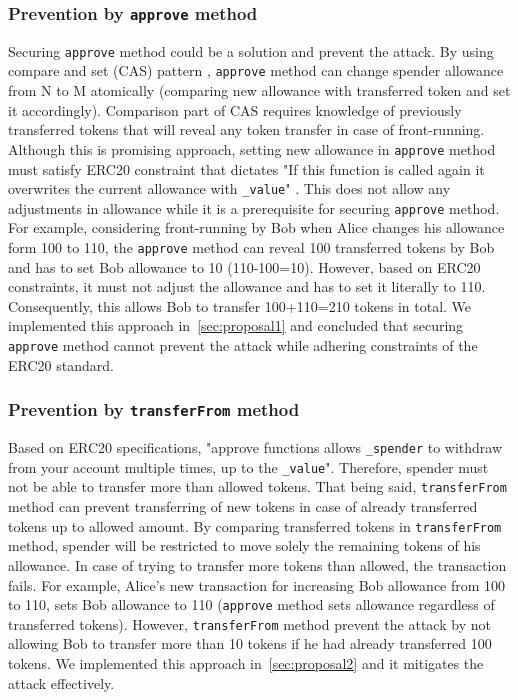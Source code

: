 \subsubsection*{Prevention by \texttt{approve} method} Securing \texttt{approve} method could be a solution and prevent the attack. By using compare and set (CAS) pattern \cite{Ref06}, \texttt{approve} method can change spender allowance from N to M atomically (\ie comparing new allowance with transferred token and set it accordingly). Comparison part of CAS requires knowledge of previously transferred tokens that will reveal any token transfer in case of front-running. Although this is promising approach,  setting new allowance in \texttt{approve} method must satisfy ERC20 constraint that dictates "If this function is called again it overwrites the current allowance with \texttt{\_value}" \cite{Ref08}. This does not allow any adjustments in allowance while it is a prerequisite for securing \texttt{approve} method. 
For example, considering front-running by Bob when Alice changes his allowance form 100 to 110, the \texttt{approve} method can reveal 100 transferred tokens by Bob and has to set Bob allowance to 10 (110-100=10). However, based on ERC20 constraints, it must not adjust the allowance and has to set it literally to 110. Consequently, this allows Bob to transfer 100+110=210 tokens in total. We implemented this approach in~\ref{sec:proposal1} and concluded that securing \texttt{approve} method cannot prevent the attack while adhering constraints of the ERC20 standard.
	
\subsubsection*{Prevention by \texttt{transferFrom} method} Based on ERC20 specifications, "approve functions allows \texttt{\_spender} to withdraw from your account multiple times, up to the \texttt{\_value}". Therefore, spender must not be able to transfer more than allowed tokens. That being said, \texttt{transferFrom} method can prevent transferring of new tokens in case of already transferred tokens up to allowed amount. By comparing transferred tokens in \texttt{transferFrom} method, spender will be restricted to move solely the remaining tokens of his allowance. In case of trying to transfer more tokens than allowed, the transaction fails. For example, Alice's new transaction for increasing Bob allowance from 100 to 110, sets Bob allowance to 110 (\texttt{approve} method sets allowance regardless of transferred tokens). However, \texttt{transferFrom} method prevent the attack by not allowing Bob to transfer more than 10 tokens if he had already transferred 100 tokens. We implemented this approach in~\ref{sec:proposal2} and it mitigates the attack effectively.

